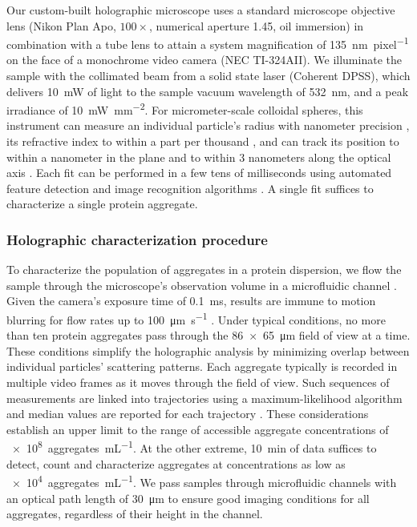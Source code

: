 Our custom-built holographic microscope uses a standard
microscope objective lens
(Nikon Plan Apo, $100\times$, numerical aperture 1.45,
oil immersion) in combination with a
tube lens to attain a system magnification of
\SI{135}{\nm\per pixel} on the face of a monochrome
video camera (NEC TI-324AII).
We illuminate the sample with the collimated beam
from a solid state laser (Coherent DPSS), which delivers
\SI{10}{\milli\watt} of light to the sample
vacuum wavelength of \SI{532}{\nm},
and a peak irradiance of \SI{10}{\milli\watt\per\square\mm}.
For micrometer-scale colloidal spheres, this instrument
can measure an individual particle's radius 
with nanometer precision \cite{moyses13,cheong09},
its refractive index to within a part per thousand
\cite{shpaisman12,moyses13}, and
can track its position to within a nanometer in the plane
and to within 3 nanometers along the optical axis
\cite{cheong10a,moyses13,krishnatreya14}.
Each fit can be performed in a few tens of milliseconds
using automated feature detection \cite{krishnatreya14a}
and image recognition algorithms \cite{yevick14}.
A single fit suffices to characterize a single protein aggregate.

\subsubsection{Holographic characterization procedure}

To characterize the population of aggregates
in a protein dispersion, we flow the sample through
the microscope's
observation volume in a microfluidic channel \cite{cheong09}.
Given the camera's exposure time of \SI{0.1}{\ms}, results
are immune to motion blurring for flow rates up to
\SI{100}{\um\per\second} \cite{cheong09,dixon11}.
Under typical conditions, no more than ten protein
aggregates pass through the \SI{86 x 65}{\um} field of
view at a time.
These conditions simplify the holographic analysis by minimizing overlap
between individual particles' scattering patterns.
Each aggregate typically is recorded in multiple video frames
as it moves through the field of view.
Such sequences of measurements are linked into trajectories
using a maximum-likelihood algorithm \cite{crocker96}
and median values are reported for each trajectory \cite{cheong09}.
These considerations establish an upper limit to the range
of accessible aggregate concentrations of \SI{e8}{aggregates\per\mL}.
At the other extreme, \SI{10}{\minute} of data suffices to
detect, count and characterize aggregates at concentrations as
low as \SI{e4}{aggregates\per\mL}. We pass samples through microfluidic channels with an optical path length of \SI{30}{\um} to ensure good imaging conditions for all aggregates, regardless of their height in the channel.

